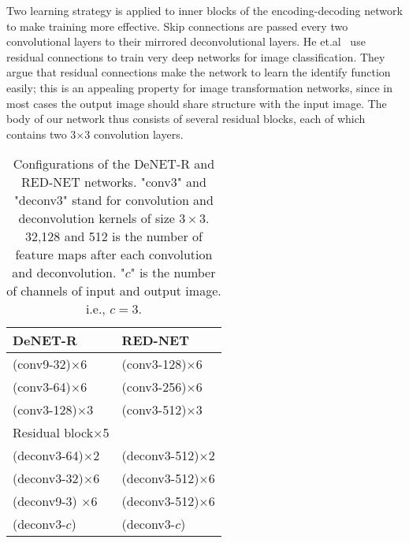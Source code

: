 Two learning strategy is applied to inner blocks of the encoding-decoding network to make training more effective. Skip connections are passed every two convolutional layers to their mirrored deconvolutional layers. He et.al~\cite{HeZRS15} use residual connections to train very deep networks for image classification. They argue that residual connections make  the network to learn the identify function easily; this is an appealing property for image transformation networks, since in most cases the output image should share structure with the input image. The body of our network thus consists of several residual blocks, each of which contains two 3$\times$3 convolution layers.
\begin{table}
\vspace{-4mm}
\centering
\caption{Configurations of the DeNET-R and RED-NET networks. "conv3" and "deconv3" stand for convolution and deconvolution kernels of size $3\times3$. 32,128 and  512 is the number of feature maps after each convolution and deconvolution. "$c$" is the number of channels of input and output image. i.e., $c = 3$. }
\begin{tabular}{l | l }\hline
DeNET-R                   &RED-NET                \\ \hline
(conv9-32)$\times$6             &(conv3-128)$\times$6       \\ \hline
(conv3-64)$\times$6             &(conv3-256)$\times$6       \\ \hline
(conv3-128)$\times$3             &(conv3-512)$\times$3       \\ \hline
Residual block$\times$5 &                           \\ \hline
(deconv3-64)$\times$2           &(deconv3-512)$\times$2       \\ \hline
(deconv3-32)$\times$6           &(deconv3-512)$\times$6       \\ \hline
(deconv9-3) $\times$6           &(deconv3-512)$\times$6       \\ \hline
(deconv3-$c$)           &(deconv3-$c$)                \\ \hline
\end{tabular}
\label{table1}
\end{table}
